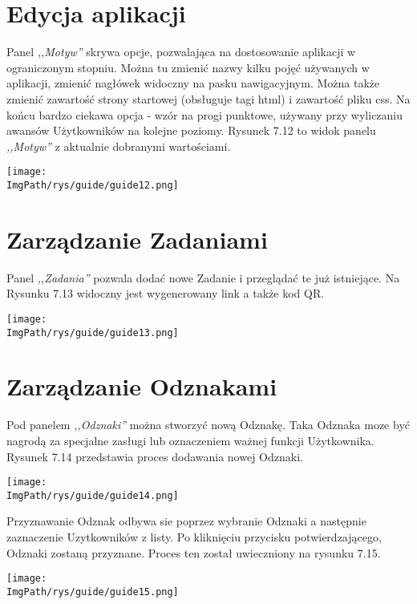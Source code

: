 \documentclass[a4paper,12pt,twoside,openany]{report}
\newcommand{\ImgPath}{.}
\begin{document}
\section{Edycja aplikacji}
Panel \textit{,,Motyw''} skrywa opcje, pozwalająca na dostosowanie aplikacji w ograniczonym stopniu. Można tu zmienić nazwy kilku pojęć używanych w aplikacji, zmienić nagłówek widoczny na pasku nawigacyjnym. Można także zmienić zawartość strony startowej (obsługuje tagi html) i zawartość pliku css. Na końcu bardzo ciekawa opcja - wzór na progi punktowe, używany przy wyliczaniu awansów Użytkowników na kolejne poziomy. Rysunek 7.12 to widok panelu \textit{,,Motyw''} z aktualnie dobranymi wartościami.
								\begin{sidewaysfigure}[!htbp]
									\begin{center}
										\centering
										\texttt{[image: \\ImgPath/rys/guide/guide12.png]}
									\end{center}
									\caption{}
									\label{UMLTS}
								\end{sidewaysfigure}
\section{Zarządzanie Zadaniami}
Panel \textit{,,Zadania''} pozwala dodać nowe Zadanie i przeglądać te już istniejące. Na Rysunku 7.13 widoczny jest wygenerowany link a także kod QR.
								\begin{sidewaysfigure}[!htbp]
									\begin{center}
										\centering
										\texttt{[image: \\ImgPath/rys/guide/guide13.png]}
									\end{center}
									\caption{}
									\label{UMLTS}
								\end{sidewaysfigure}
\section{Zarządzanie Odznakami}
Pod panelem \textit{,,Odznaki''} można stworzyć nową Odznakę. Taka Odznaka moze być nagrodą za specjalne zasługi lub oznaczeniem ważnej funkcji Użytkownika. Rysunek 7.14 przedstawia proces dodawania nowej Odznaki.
								\begin{sidewaysfigure}[!htbp]
									\begin{center}
										\centering
										\texttt{[image: \\ImgPath/rys/guide/guide14.png]}
									\end{center}
									\caption{}
									\label{UMLTS}
								\end{sidewaysfigure}
Przyznawanie Odznak odbywa sie poprzez wybranie Odznaki a następnie zaznaczenie Uzytkowników z listy. Po kliknięciu przycisku potwierdzającego, Odznaki zostaną przyznane. Proces ten został uwieczniony na rysunku 7.15.
								\begin{sidewaysfigure}[!htbp]
									\begin{center}
										\centering
										\texttt{[image: \\ImgPath/rys/guide/guide15.png]}
									\end{center}
									\caption{}
									\label{UMLTS}
								\end{sidewaysfigure}
\end{document}
